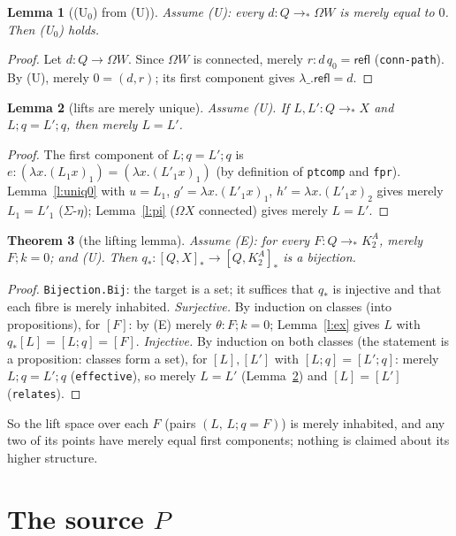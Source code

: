 \documentclass[11pt]{amsart}
\newtheorem{theorem}{Theorem}
\newtheorem{lemma}[theorem]{Lemma}
\theoremstyle{definition}
\theoremstyle{remark}
\newcommand{\Om}{\Omega}
\newcommand{\code}[1]{\texttt{#1}}
\newcommand{\refl}{\mathsf{refl}}
\newcommand{\hc}[2]{[#1,#2]_*}
\newcommand{\cls}[1]{[#1]}
\begin{document}
\begin{lemma}[(U$_0$) from (U)]\label{l:u0}
Assume (U): every $d:Q\to_*\Om W$ is merely equal to $0$. Then
(U$_0$) holds.
\end{lemma}
\begin{proof}
Let $d:Q\to\Om W$. Since $\Om W$ is connected, merely $r:d\,q_0=\refl$
(\code{conn-path}). By (U), merely $0=(d,r)$; its first component
gives $\lambda\_.\refl=d$.
\end{proof}

\begin{lemma}[lifts are merely unique]\label{l:uniq}
Assume (U). If $L,L':Q\to_*X$ and $L;q=L';q$, then merely $L=L'$.
\end{lemma}
\begin{proof}
The first component of $L;q=L';q$ is $e:(\lambda x.(L_1x)_1)=(\lambda
x.(L'_1x)_1)$ (by definition of \code{ptcomp} and \code{fpr}).
Lemma~\ref{l:uniq0} with $u=L_1$, $g'=\lambda x.(L'_1x)_1$,
$h'=\lambda x.(L'_1x)_2$ gives merely $L_1=L'_1$ ($\Sigma$-$\eta$);
Lemma~\ref{l:pi} ($\Om X$ connected) gives merely $L=L'$.
\end{proof}

\begin{theorem}[the lifting lemma]\label{t:lift}
Assume (E): for every $F:Q\to_*K^A_2$, merely $F;k=0$; and (U). Then
$q_*:\hc QX\to\hc Q{K^A_2}$ is a bijection.
\end{theorem}
\begin{proof}
\code{Bijection.Bij}: the target is a set; it suffices that $q_*$ is
injective and that each fibre is merely inhabited.
\emph{Surjective.} By induction on classes (into propositions), for
$\cls F$: by (E) merely $\theta:F;k=0$; Lemma~\ref{l:ex} gives $L$ with
$q_*\cls L=\cls{L;q}=\cls F$.
\emph{Injective.} By induction on both classes (the statement is a
proposition: classes form a set), for $\cls L,\cls{L'}$ with
$\cls{L;q}=\cls{L';q}$: merely $L;q=L';q$ (\code{effective}), so merely
$L=L'$ (Lemma~\ref{l:uniq}) and $\cls L=\cls{L'}$ (\code{relates}).
\end{proof}

So the lift space over each $F$ (pairs $(L,\,L;q=F)$) is merely
inhabited, and any two of its points have merely equal first components;
nothing is claimed about its higher structure.

\section{The source $P$}
\end{document}
